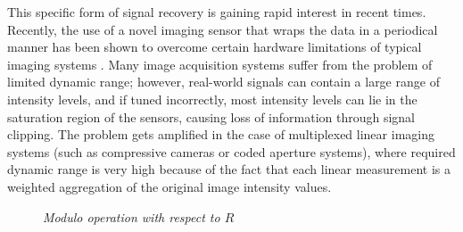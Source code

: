 
This specific form of signal recovery is gaining rapid interest in recent times. Recently, the use of a novel imaging sensor that wraps the data in a periodical manner  has been shown to overcome certain hardware limitations of typical imaging systems \cite{Bhandari,Zhao2015}. Many image acquisition systems suffer from the problem of limited dynamic range; however, real-world signals can contain a large range of intensity levels, and if tuned incorrectly, most intensity levels can lie in the saturation region of the sensors, causing loss of information through signal clipping. The problem gets amplified in the case of multiplexed linear imaging systems (such as compressive cameras or coded aperture systems), where required dynamic range is very high because of the fact that each linear measurement is a weighted aggregation of the original image intensity values. 

\begin{figure}[!t]
	\begin{center}
	\end{center}
	\caption{\emph{Modulo operation with respect to $R$}}
	\label{fig:orgmodop}
\end{figure}


